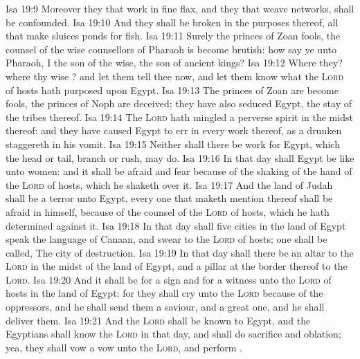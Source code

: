 \vs Isa 19:9 Moreover they that work in fine flax, and they that weave networks, shall be confounded.
\vs Isa 19:10 And they shall be broken in the purposes thereof, all that make sluices  ponds for fish.
\vs Isa 19:11 Surely the princes of Zoan  fools, the counsel of the wise counsellors of Pharaoh is become brutish: how say ye unto Pharaoh, I  the son of the wise, the son of ancient kings?
\vs Isa 19:12 Where  they? where  thy wise ? and let them tell thee now, and let them know what the \textsc{Lord} of hosts hath purposed upon Egypt.
\vs Isa 19:13 The princes of Zoan are become fools, the princes of Noph are deceived; they have also seduced Egypt,  the stay of the tribes thereof.
\vs Isa 19:14 The \textsc{Lord} hath mingled a perverse spirit in the midst thereof: and they have caused Egypt to err in every work thereof, as a drunken  staggereth in his vomit.
\vs Isa 19:15 Neither shall there be  work for Egypt, which the head or tail, branch or rush, may do.
\vs Isa 19:16 In that day shall Egypt be like unto women: and it shall be afraid and fear because of the shaking of the hand of the \textsc{Lord} of hosts, which he shaketh over it.
\vs Isa 19:17 And the land of Judah shall be a terror unto Egypt, every one that maketh mention thereof shall be afraid in himself, because of the counsel of the \textsc{Lord} of hosts, which he hath determined against it.
\vs Isa 19:18 In that day shall five cities in the land of Egypt speak the language of Canaan, and swear to the \textsc{Lord} of hosts; one shall be called, The city of destruction.
\vs Isa 19:19 In that day shall there be an altar to the \textsc{Lord} in the midst of the land of Egypt, and a pillar at the border thereof to the \textsc{Lord}.
\vs Isa 19:20 And it shall be for a sign and for a witness unto the \textsc{Lord} of hosts in the land of Egypt: for they shall cry unto the \textsc{Lord} because of the oppressors, and he shall send them a saviour, and a great one, and he shall deliver them.
\vs Isa 19:21 And the \textsc{Lord} shall be known to Egypt, and the Egyptians shall know the \textsc{Lord} in that day, and shall do sacrifice and oblation; yea, they shall vow a vow unto the \textsc{Lord}, and perform .
